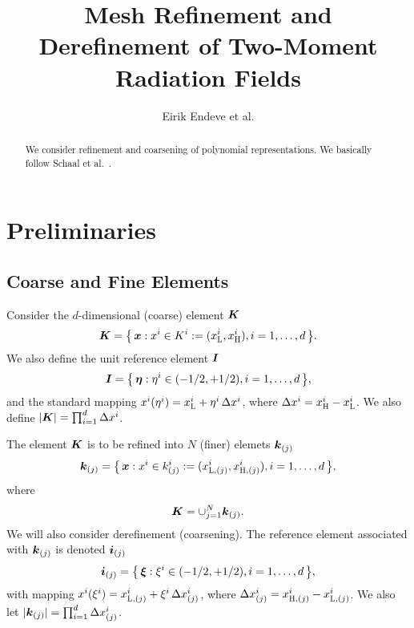 \documentclass[10pt]{article}
\newcommand{\Lo}{\textsc{L}}
\newcommand{\Hi}{\textsc{H}}
\newcommand{\dx}{\Delta x}
\begin{document}
\title{Mesh Refinement and Derefinement of Two-Moment Radiation Fields}
\author{Eirik Endeve et al.}

\maketitle

\begin{abstract}
  We consider refinement and coarsening of polynomial representations.
  We basically follow Schaal et al.~\cite{schaal_etal_2015}.
\end{abstract}

\tableofcontents

\section{Preliminaries}

\subsection{Coarse and Fine Elements}

Consider the $d$-dimensional (coarse) element $\boldsymbol{K}$
\begin{equation}
  \vect{K} = \big\{\,\vect{x} : x^{i} \in K^{i} := (x_{\Lo}^{i},x_{\Hi}^{i}), i = 1,\ldots,d \,\big\}.
\end{equation}
We also define the unit reference element $\boldsymbol{I}$
\begin{equation}
  \boldsymbol{I} = \big\{\,\boldsymbol{\eta} : \eta^{i} \in (-1/2,+1/2), i = 1,\ldots,d \,\big\},
\end{equation}
and the standard mapping $x^{i}(\eta^{i})=x_{\Lo}^{i}+\eta^{i}\,\dx^{i}$, where $\dx^{i}=x_{\Hi}^{i}-x_{\Lo}^{i}$.
We also define $|\vect{K}|=\prod_{i=1}^{d}\dx^{i}$.

The element $\boldsymbol{K}$ is to be refined into $N$ (finer) elemets $\boldsymbol{k}_{(j)}$
\begin{equation}
  \vect{k}_{(j)} = \big\{\,\vect{x} : x^{i} \in k_{(j)}^{i} := (x_{\Lo,(j)}^{i},x_{\Hi,(j)}^{i}), i = 1,\ldots,d\,\big\},
\end{equation}
where
\begin{equation}
  \boldsymbol{K} = \cup_{j=1}^{N}\boldsymbol{k}_{(j)}.
\end{equation}
We will also consider derefinement (coarsening).
The reference element associated with $\boldsymbol{k}_{(j)}$ is denoted $\boldsymbol{i}_{(j)}$
\begin{equation}
  \boldsymbol{i}_{(j)} = \big\{\,\boldsymbol{\xi} : \xi^{i} \in (-1/2,+1/2), i = 1,\ldots,d \,\big\},
\end{equation}
with mapping $x^{i}(\xi^{i})=x_{\Lo,(j)}^{i}+\xi^{i}\,\dx_{(j)}^{i}$, where $\dx_{(j)}^{i}=x_{\Hi,(j)}^{i}-x_{\Lo,(j)}^{i}$.
We also let $|\vect{k}_{(j)}|=\prod_{i=1}^{d}\dx_{(j)}^{i}$.
\end{document}
